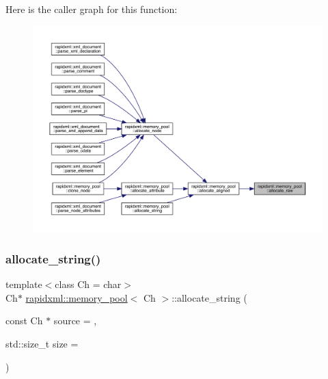 Here is the caller graph for this function\+:\nopagebreak
\begin{figure}[H]
\begin{center}
\leavevmode
\includegraphics[width=350pt]{classrapidxml_1_1memory__pool_a1aed504a747303352e05f61c6ccbbebb_icgraph}
\end{center}
\end{figure}
\mbox{\label{classrapidxml_1_1memory__pool_a171941b39d55b868358da97462185f58}} 
\subsubsection{\texorpdfstring{allocate\_string()}{allocate\_string()}}
{\footnotesize\ttfamily template$<$class Ch  = char$>$ \\
Ch$\ast$ \mbox{\hyperlink{classrapidxml_1_1memory__pool}{rapidxml\+::memory\+\_\+pool}}$<$ Ch $>$\+::allocate\+\_\+string (\begin{DoxyParamCaption}\item[{const Ch $\ast$}]{source = {},  }\item[{std\+::size\+\_\+t}]{size = {} }\end{DoxyParamCaption})\hspace{0.3cm}{\ttfamily [inline]}}

